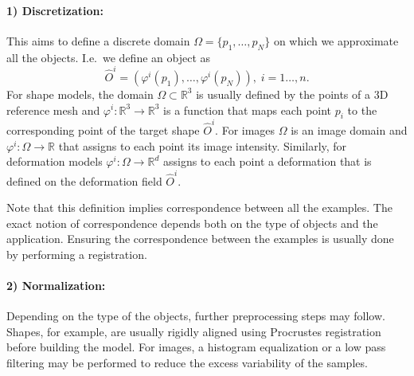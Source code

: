 \documentclass{InsightArticle}
\def\R{\mathds{R}} %
\begin{document}
\paragraph{1) Discretization:} This aims to define a discrete
domain $\Omega = \{p_1, \ldots, p_N\}$ on which we approximate all the objects. I.e.\ we define an object as
\[
\hat{O}^i = (\varphi^i(p_1), \ldots, \varphi^i(p_N)), \; i  = 1 \dots, n. 
\]
For shape models, the domain $\Omega \subset \R^3$ is usually defined
by the points of a 3D reference mesh and $\varphi^i : \R^3 \to \R^3$
is a function that maps each point $p_i$ to the corresponding point of
the target shape $\hat{O}^i$. For images $\Omega$ is an image domain
and $\varphi^i : \Omega \to \R$ that assigns to each point its image
intensity. Similarly, for deformation models $\varphi^i : \Omega \to
\R^d$ assigns to each point a deformation that is defined on the
deformation field $\hat{O}^i$.

Note that this definition implies correspondence between all the examples. The
exact notion of correspondence depends both on the type of objects and the
application. Ensuring the correspondence between the examples is usually done by performing a registration.
\paragraph{2) Normalization:}
Depending on the type of the objects, further preprocessing steps may
follow. Shapes, for example, are usually rigidly aligned using
Procrustes registration before building the model. For images, a
histogram equalization or a low pass filtering may be performed to
reduce the excess variability of the samples.
\end{document}
